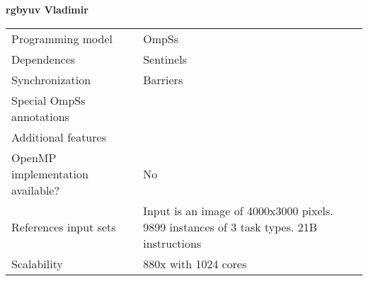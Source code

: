 \section*{}
\label{rbgyuv_vladimir}
\centering
\Huge
\textbf{rgbyuv Vladimir}

\begin{table}[h!]
  \large
  \centering
  \begin{tabular}{|l|l|}
    \hline
    Programming model                & OmpSs \\
    Dependences                      & Sentinels \\
    Synchronization                  & Barriers \\
    Special OmpSs annotations        &  \\
    Additional features              &  \\
    OpenMP implementation available? & No \\
    References input sets            & Input is an image of 4000x3000 pixels. 9899 instances of 3 task types. 21B instructions \\
    Scalability                      & 880x with 1024 cores \\
    \hline
  \end{tabular}
\end{table}

\newpage
